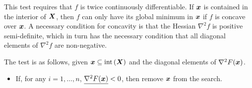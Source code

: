 \documentclass[../global-optimization.tex]{subfiles}
\begin{document}
  This test requires that $f$ is twice continuously differentiable.
  If $\x$ is contained in the interior of $\X$, 
  then $f$ can only have its global minimum in $\x$ if $f$ is concave over $\x$.
  A necessary condition for concavity is that the 
  Hessian $\nabla^2 f$ is positive semi-definite, 
  which in turn has the necessary condition that 
  all diagonal elements of $\nabla^2 f$ are non-negative.

  The test is as follows, given $\x \subseteq \Iint(\X)$ and 
  the diagonal elements of $\nabla^2 F(\x)$.

  \begin{itemize}
    \item If, for any $i = 1,\dots,n$, $\ul {\nabla^2 F(\x)} < 0$, then remove $\x$ from the search.
  \end{itemize}
\end{document}
